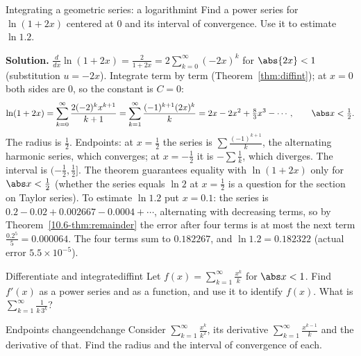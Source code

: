 \documentclass[11pt]{article}
\begin{document}
\begin{exmp}{Integrating a geometric series: a logarithm}{int}
Find a power series for $\ln(1+2x)$ centered at $0$ and its interval of convergence. Use it to estimate $\ln1.2$.

\textbf{Solution.} $\frac d{dx}\ln(1+2x)=\frac2{1+2x}=2\sum_{k=0}^\infty(-2x)^k$ for $\abs{2x}<1$ (substitution $u=-2x$). Integrate term by term (Theorem~\ref{thm:diffint}); at $x=0$ both sides are $0$, so the constant is $C=0$:
\[
\ln(1+2x)=\sum_{k=0}^\infty\frac{2(-2)^kx^{k+1}}{k+1}=\sum_{k=1}^\infty\frac{(-1)^{k+1}(2x)^k}k=2x-2x^2+\tfrac83x^3-\cdots,\qquad\abs x<\tfrac12 .
\]
The radius is $\frac12$. Endpoints: at $x=\frac12$ the series is $\sum\frac{(-1)^{k+1}}k$, the alternating harmonic series, which converges; at $x=-\frac12$ it is $-\sum\frac1k$, which diverges. The interval is $(-\frac12,\frac12]$. The theorem guarantees equality with $\ln(1+2x)$ only for $\abs x<\frac12$ (whether the series equals $\ln2$ at $x=\frac12$ is a question for the section on Taylor series). To estimate $\ln1.2$ put $x=0.1$: the series is $0.2-0.02+0.002667-0.0004+\cdots$, alternating with decreasing terms, so by Theorem~\ref{10.6-thm:remainder} the error after four terms is at most the next term $\frac{0.2^5}5=0.000064$. The four terms sum to $0.182267$, and $\ln1.2=0.182322$ (actual error $5.5\times10^{-5}$).
\end{exmp}

\begin{kc}{Differentiate and integrate}{diffint}
Let $f(x)=\sum_{k=1}^\infty\frac{x^k}k$ for $\abs x<1$. Find $f'(x)$ as a power series and as a function, and use it to identify $f(x)$. What is $\sum_{k=1}^\infty\frac1{k\,3^k}$?
\end{kc}

\begin{think}{Endpoints change}{endchange}
Consider $\sum_{k=1}^\infty\frac{x^k}{k^2}$, its derivative $\sum_{k=1}^\infty\frac{x^{k-1}}k$ and the derivative of that. Find the radius and the interval of convergence of each.
\end{think}
\end{document}
